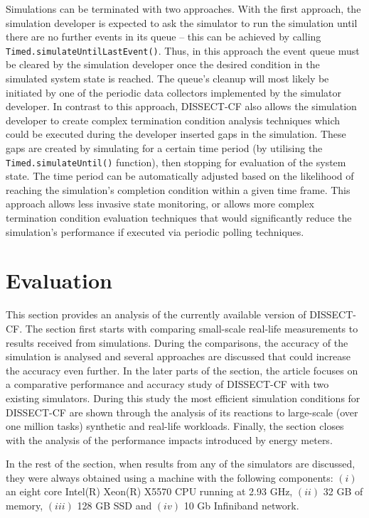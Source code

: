 \documentclass[sort, compress, 5p]{elsarticle}
\begin{document}
Simulations can be terminated with two approaches. With the first approach, the simulation developer is expected to ask the simulator to run the simulation until there are no further events in its queue -- this can be achieved by calling \verb+Timed.simulateUntilLastEvent()+. Thus, in this approach the event queue must be cleared by the simulation developer once the desired condition in the simulated system state is reached. The queue's cleanup will most likely be initiated by one of the periodic data collectors implemented by the simulator developer. In contrast to this approach, DISSECT-CF also allows the simulation developer to create complex termination condition analysis techniques which could be executed during the developer inserted gaps in the simulation. These gaps are created by simulating for a certain time period (by utilising the \verb+Timed.simulateUntil()+ function), then stopping for evaluation of the system state. The time period can be automatically adjusted based on the likelihood of reaching the simulation's completion condition within a given time frame. This approach allows less invasive state monitoring, or allows more complex termination condition evaluation techniques that would significantly reduce the simulation's performance if executed via periodic polling techniques.

\section{Evaluation} \label{sec-eval}

This section provides an analysis of the currently available version of DISSECT-CF. The section first starts with comparing small-scale real-life measurements to results received from simulations. During the comparisons, the accuracy of the simulation is analysed and several approaches are discussed that could increase the accuracy even further. In the later parts of the section, the article focuses on a comparative performance and accuracy study of DISSECT-CF with two existing simulators. During this study the most efficient simulation conditions for DISSECT-CF are shown through the analysis of its reactions to large-scale (over one million tasks) synthetic and real-life workloads. Finally, the section closes with the analysis of the performance impacts introduced by energy meters.

In the rest of the section, when results from any of the simulators are discussed, they were always obtained using a machine with the following components: $(i)$ an eight core Intel(R) Xeon(R) X5570 CPU   running at 2.93 GHz, $(ii)$ 32 GB of memory, $(iii)$ 128 GB SSD and $(iv)$ 10 Gb Infiniband network.
\end{document}
